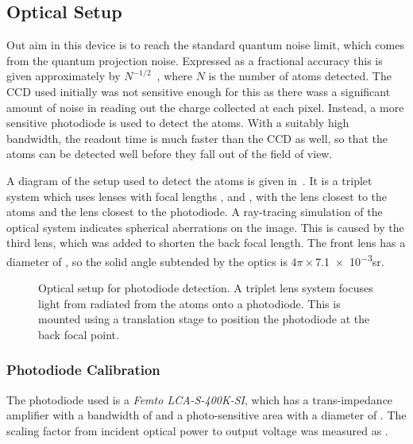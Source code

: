\subsection{Optical Setup}\label{subsec:optical_setup}
Out aim in this device is to reach the standard quantum noise limit,
which comes from the quantum projection noise. Expressed as a
fractional accuracy this is given approximately by
$N^{-1/2}$~\cite{Bollinger1996}, where $N$ is the number of atoms detected.
The CCD used initially was not sensitive enough for this as there wass a
significant amount of noise in reading out the charge collected at each pixel.
Instead, a more sensitive photodiode is used to detect the atoms. With a
suitably high bandwidth, the readout time is much faster than the CCD as well,
so that the atoms can be detected well before they fall out of the field of
view. \par\noindent A diagram of the setup used to detect the atoms is given
in~. It is a triplet system which uses
lenses with focal lengths ,
 and , with the
 lens closest to the atoms and the 
lens closest to the photodiode. A ray-tracing simulation of the optical
system indicates spherical aberrations on the image. This is caused by
the third lens, which was added to shorten the back focal length. The
front lens has a diameter of
, so the solid angle subtended by the
optics is \(4\pi \times\)\num{7.1e-3}\si{\steradian}.
\begin{figure}[!htbp] 
  \centering \fontsize{24pt}{24pt}
	\resizebox{0.7\textwidth}{!}{}
	\caption[Optical setup for Photodiode Detection]{Optical setup for photodiode
		detection. A triplet lens system focuses light from radiated from the atoms
		onto a photodiode. This is mounted using a translation stage to
  position the photodiode at the back focal point.}
  \label{fig:photodiode_optics}
\end{figure}

\subsubsection{Photodiode Calibration}
The photodiode used is a \textit{Femto LCA-S-400K-SI},
which has a trans-impedance amplifier with a bandwidth of  and a photo-sensitive area
with a diameter of . The scaling factor from
incident optical power to output voltage was measured as . 
